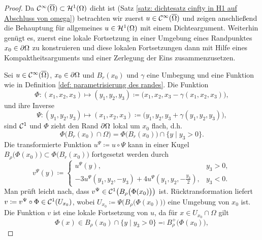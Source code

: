 \begin{proof}
	Da \(\mathcal{C}^\infty(\overline{\Omega})\subset \mathcal{H}^1(\Omega)\) dicht ist (Satz \ref{satz: dichtesatz cinfty in H1 auf Abschluss von omega}) betrachten wir zuerst \(u\in\mathcal{C}^\infty(\overline{\Omega})\) und zeigen anschließend die Behauptung für allgemeines \(u\in\mathcal{H}^1(\Omega)\) mit einem Dichteargument. Weiterhin genügt es, zuerst eine lokale Fortsetzung in einer Umgebung eines Randpunktes \(x_0\in\partial\Omega\) zu konstruieren und diese lokalen Fortsetzungen dann mit Hilfe eines Kompaktheitsarguments und einer Zerlegung der Eins zusammenzusetzen.\vspace{1.5mm}
	
	Sei \(u\in\mathcal{C}^\infty(\overline{\Omega})\), \(x_0\in\partial\Omega\) und \(B_r(x_0)\) und \(\gamma\) eine Umbegung und eine Funktion wie in Definition \ref{def: parametrisierung des randes}. Die Funktion
	\begin{equation*}
		\Phi\colon(x_1,x_2,x_3)\mapsto (y_1,y_2,y_3)\coloneqq\big(x_1,x_2,x_3-\gamma(x_1,x_2,x_3)\big),
	\end{equation*}
	und ihre Inverse
	\begin{equation*}
		\Psi\colon(y_1,y_2,y_3)\mapsto (x_1,x_2,x_3)\coloneqq\big(y_1,y_2,y_3+\gamma(y_1,y_2,y_3)\big),
	\end{equation*}
	sind \(\mathcal{C}^1\) und \(\Phi\) zieht den Rand \(\partial\Omega\) lokal um \(x_0\) flach, d.h.
	\begin{equation*}
		\Phi\big(B_r(x_0)\cap\Omega\big)=\Phi\big(B_r(x_0)\big)\cap\{y\mid y_3>0\}.
	\end{equation*}
	Die transformierte Funktion \(u^\Psi\coloneqq u\circ\Psi\) kann in einer Kugel \(B_\rho\big(\Phi(x_0)\big)\subset\Phi\big(B_r(x_0)\big)\) fortgesetzt werden durch
	\begin{equation*}
		v^\Psi(y)\coloneqq
		\begin{cases}
			u^\Psi(y),&y_3>0,\\
			-3u^\Psi(y_1,y_2,-y_3)+4u^\Psi(y_1,y_2,-\tfrac{y_3}{2}),&y_3<0.
		\end{cases}
	\end{equation*}
	Man prüft leicht nach, dass \(v^\Psi\in\mathcal{C}^1\big(B_\rho\big(\Phi(x_0)\big)\big)\) ist. Rücktransformation liefert \(v\coloneqq v^\Psi\circ\Phi\in\mathcal{C}^1(U_{x_0})\), wobei \(U_{x_0}\coloneqq\Psi\big(B_\rho\big(\Phi(x_0)\big)\big)\) eine Umgebung von \(x_0\) ist. Die Funktion \(v\) ist eine lokale Fortsetzung von \(u\), da für \(x\in U_{x_0}\cap\Omega\) gilt
	\begin{equation*}
		\Phi(x)\in B_\rho(x_0)\cap\{y\mid y_3>0\}\eqqcolon B_\rho^+\big(\Phi(x_0)\big),

\end{equation*}
\end{proof}
